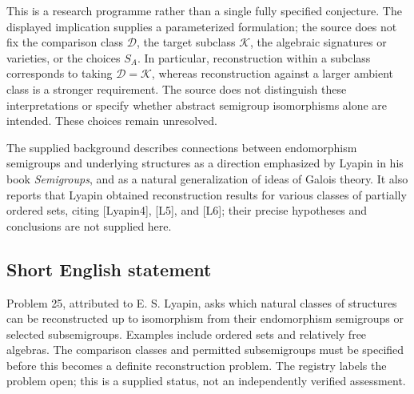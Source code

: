 \documentclass[11pt]{article}
\begin{document}
This is a research programme rather than a single fully specified conjecture. The displayed implication supplies a parameterized formulation; the source does not fix the comparison class \(\mathcal D\), the target subclass \(\mathcal K\), the algebraic signatures or varieties, or the choices \(S_A\). In particular, reconstruction within a subclass corresponds to taking \(\mathcal D=\mathcal K\), whereas reconstruction against a larger ambient class is a stronger requirement. The source does not distinguish these interpretations or specify whether abstract semigroup isomorphisms alone are intended. These choices remain unresolved.

The supplied background describes connections between endomorphism semigroups and underlying structures as a direction emphasized by Lyapin in his book \emph{Semigroups}, and as a natural generalization of ideas of Galois theory. It also reports that Lyapin obtained reconstruction results for various classes of partially ordered sets, citing [Lyapin4], [L5], and [L6]; their precise hypotheses and conclusions are not supplied here.
\subsection{Short English statement}
Problem 25, attributed to E. S. Lyapin, asks which natural classes of structures can be reconstructed up to isomorphism from their endomorphism semigroups or selected subsemigroups. Examples include ordered sets and relatively free algebras. The comparison classes and permitted subsemigroups must be specified before this becomes a definite reconstruction problem. The registry labels the problem open; this is a supplied status, not an independently verified assessment.
\end{document}
